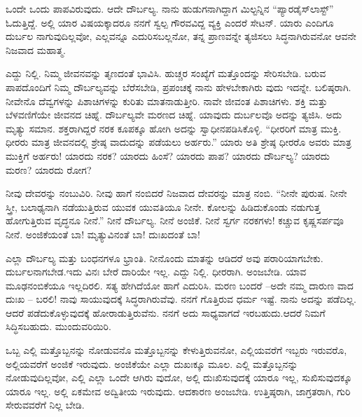 ಒಂದೇ ಒಂದು ಪಾಪವಿರುವುದು. ಆದೇ ದೌರ್ಬಲ್ಯ. ನಾನು ಹುಡುಗನಾಗಿದ್ದಾಗ ಮಿಲ್ಟನ್ನಿನ “ಪ್ಯಾರಡೈಸ್​ ಲಾಸ್ಟ್​” ಓದುತ್ತಿದ್ದೆ. ಅಲ್ಲಿ ಯಾರ ವಿಷಯಕ್ಕಾದರೂ ನನಗೆ ಸ್ವಲ್ಪ ಗೌರವವಿದ್ದ ವ್ಯಕ್ತಿ ಎಂದರೆ ಸೇಟನ್​. ಯಾರು ಎಂದಿಗೂ ದುರ್ಬಲ ನಾಗುವುದಿಲ್ಲವೋ, ಎಲ್ಲವನ್ನೂ ಎದುರಿಸಬಲ್ಲನೋ, ತನ್ನ ಪ್ರಾಣವನ್ನೇ ತ್ಯಜಿಸಲು ಸಿದ್ಧನಾಗಿರುವನೋ ಆವನೇ ನಿಜವಾದ ಮಹಾತ್ಮ.

ಎದ್ದು ನಿಲ್ಲಿ. ನಿಮ್ಮ ಜೀವನವನ್ನು ತೃಣದಂತೆ ಭಾವಿಸಿ. ಹುಚ್ಚರ ಸಂಖ್ಯೆಗೆ ಮತ್ತೊಂದನ್ನು ಸೇರಿಸಬೇಡಿ. ಬರುವ ಪಾಪದೊಂದಿಗೆ ನಿಮ್ಮ ದೌರ್ಬಲ್ಯವನ್ನು ಬೆರೆಸಬೇಡಿ, ಪ್ರಪಂಚಕ್ಕೆ ನಾನು ಹೇಳಬೇಕಾಗಿರು ವುದು ಇದನ್ನೇ. ಬಲಿಷ್ಠರಾಗಿ. ನೀವೇನೊ ದೆವ್ವಗಳನ್ನು ಪಿಶಾಚಿಗಳನ್ನು ಕುರಿತು ಮಾತನಾಡುತ್ತೀರಿ. ನಾವೇ ಜೀವಂತ ಪಿಶಾಚಿಗಳು. ಶಕ್ತಿ ಮತ್ತು ಬೆಳವಣಿಗೆಯೇ ಜೀವನದ ಚಿಹ್ನೆ. ದೌರ್ಬಲ್ಯವೇ ಮರಣದ ಚಿಹ್ನೆ. ಯಾವುದು ದುರ್ಬಲವೊ ಅದನ್ನು ತ್ಯಜಿಸಿ. ಅದು ಮೃತ್ಯು ಸಮಾನ. ಶಕ್ತರಾಗಿದ್ದರೆ ನರಕ ಕೂಪಕ್ಕೂ ಹೋಗಿ ಅದನ್ನು ಸ್ವಾಧೀನಪಡಿಸಿಕೊಳ್ಳಿ. “ಧೀರರಿಗೆ ಮಾತ್ರ ಮುಕ್ತಿ. ಧೀರರು ಮಾತ್ರ ಜೀವನದಲ್ಲಿ ಶ್ರೇಷ್ಠ ವಾದುದನ್ನು ಪಡೆಯಲು ಅರ್ಹರು.” ಯಾರು ಅತಿ ಶ್ರೇಷ್ಠ ಧೀರರೊ ಅವರು ಮಾತ್ರ ಮುಕ್ತಿಗೆ ಅರ್ಹರು! ಯಾರದು ನರಕ? ಯಾರದು ಹಿಂಸೆ? ಯಾರದು ಪಾಪ? ಯಾರದು ದೌರ್ಬಲ್ಯ? ಯಾರದು ಮರಣ? ಯಾರದು ರೋಗ?

ನೀವು ದೇವರನ್ನು ನಂಬುವಿರಿ. ನೀವು ಹಾಗೆ ನಂಬಿದರೆ ನಿಜವಾದ ದೇವರನ್ನು ಮಾತ್ರ ನಂಬಿ. “ನೀನೇ ಪುರುಷ. ನೀನೇ ಸ್ತ್ರೀ, ಬಲಾಢ್ಯನಾಗಿ ನಡೆಯುತ್ತಿರುವ ಯುವಕ ಯುವತಿಯೂ ನೀನೇ. ಕೋಲನ್ನು ಹಿಡಿದುಕೊಂಡು ನಡುಗುತ್ತ ಹೋಗುತ್ತಿರುವ ವೃದ್ಧನೂ ನೀನೆ.” ನೀನೆ ದೌರ್ಬಲ್ಯ. ನೀನೆ ಅಂಜಿಕೆ. ನೀನೆ ಸ್ವರ್ಗ ನರಕಗಳು! ಕಚ್ಚುವ ಕೃಷ್ಣಸರ್ಪವೂ ನೀನೆ. ಅಂಜಿಕೆಯಂತೆ ಬಾ! ಮೃತ್ಯುವಿನಂತೆ ಬಾ! ದುಃಖದಂತೆ ಬಾ!

ಎಲ್ಲಾ ದೌರ್ಬಲ್ಯ ಮತ್ತು ಬಂಧನಗಳೂ ಭ್ರಾಂತಿ. ನೀನೊಂದು ಮಾತನ್ನು ಆಡಿದರೆ ಅವು ಪರಾರಿಯಾಗಬೇಕು. ದುರ್ಬಲನಾಗಬೇಡ.ಇದು ವಿನಃ ಬೇರೆ ದಾರಿಯೇ ಇಲ್ಲ. ಎದ್ದು ನಿಲ್ಲಿ. ಧೀರರಾಗಿ. ಅಂಜಬೇಡಿ. ಯಾವ ಮೂಢನಂಬಿಕೆಯೂ ಇಲ್ಲದಿರಲಿ. ಸತ್ಯ ಹೇಗಿದೆಯೋ ಹಾಗೆ ಎದುರಿಸಿ. ಮರಣ ಬಂದರೆ –ಅದೇ ನಮ್ಮ ದಾರುಣ ವಾದ ದುಃಖ – ಬರಲಿ! ನಾವು ಸಾಯುವುದಕ್ಕೆ ಸಿದ್ಧರಾಗಿರುವೆವು. ನನಗೆ ಗೊತ್ತಿರುವ ಧರ್ಮ ಇಷ್ಟೆ. ನಾನು ಅದನ್ನು ಪಡೆದಿಲ್ಲ. ಆದರೆ ಪಡೆದುಕೊಳ್ಳುವುದಕ್ಕೆ ಹೋರಾಡುತ್ತಿರುವೆನು. ನನಗೆ ಅದು ಸಾಧ್ಯವಾಗದೆ ಇರಬಹುದು.ಆದರೆ ನಿಮಗೆ ಸಿದ್ಧಿಸಬಹುದು. ಮುಂದುವರಿಯಿರಿ.

ಒಬ್ಬ ಎಲ್ಲಿ ಮತ್ತೊಬ್ಬನನ್ನು ನೋಡುವನೊ ಮತ್ತೊಬ್ಬನನ್ನು ಕೇಳುತ್ತಿರುವನೋ, ಎಲ್ಲಿಯವರೆಗೆ ಇಬ್ಬರು ಇರುವರೊ, ಅಲ್ಲಿಯವರೆಗೆ ಅಂಜಿಕೆ ಇರುವುದು. ಅಂಜಿಕೆಯೇ ಎಲ್ಲಾ ದುಖಃಕ್ಕೂ ಮೂಲ. ಎಲ್ಲಿ ಮತ್ತೊಬ್ಬನನ್ನು ನೋಡುವುದಿಲ್ಲವೋ, ಎಲ್ಲಿ ಎಲ್ಲಾ ಒಂದೇ ಆಗಿರು ವುದೋ, ಅಲ್ಲಿ ದುಃಖಿಸುವುದಕ್ಕೆ ಯಾರೂ ಇಲ್ಲ, ಸುಖಿಸುವುದಕ್ಕೂ ಯಾರೂ ಇಲ್ಲ. ಅಲ್ಲಿ ಏಕಮೇವ ಅದ್ವಿತೀಯ ಇರುವುದು. ಆದಕಾರಣ ಅಂಜಬೇಡಿ. ಉತ್ತಿಷ್ಠರಾಗಿ, ಜಾಗ್ರತರಾಗಿ, ಗುರಿ ಸೇರುವವರೆಗೆ ನಿಲ್ಲ ಬೇಡಿ.

